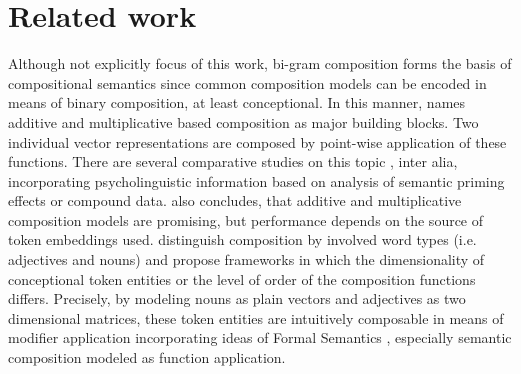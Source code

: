 \section{Related work}

Although not explicitly focus of this work, bi-gram composition forms the basis of compositional semantics since common composition models can be encoded in means of binary composition, at least conceptional. In this manner, \textcite{zanzotto_estimating_2010} names additive and multiplicative based composition as major building blocks. Two individual vector representations are composed by point-wise application of these functions. There are several comparative studies on this topic \autocite{mitchell_composition_2010, dima_reverse-engineering_2015}, inter alia, incorporating psycholinguistic information based on analysis of semantic priming effects or compound data. \textcite{mitchell_composition_2010} also concludes, that additive and multiplicative composition models are promising, but performance depends on the source of token embeddings used. %
\textcite{baroni_nouns_2010, clark_type-driven_2013, grefenstette_multi-step_2013, baroni_frege_2014}  	distinguish composition by involved word types (i.e. adjectives and nouns) and propose frameworks in which the dimensionality of conceptional token entities or the level of order of the composition functions differs. Precisely, by modeling nouns as plain vectors and adjectives as two dimensional matrices, these token entities are intuitively composable in means of modifier application incorporating ideas of Formal Semantics \autocite{montague_proper_1973}, especially semantic composition modeled as function application. %

